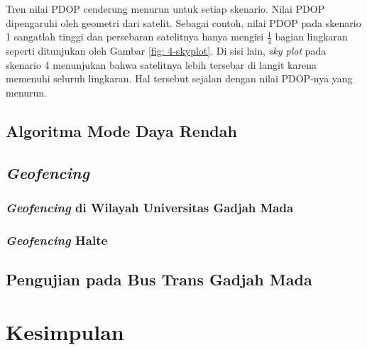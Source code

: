 \documentclass[conference]{IEEEtran}
\begin{document}
Tren nilai PDOP cenderung menurun untuk setiap skenario. Nilai PDOP dipengaruhi oleh geometri dari satelit. Sebagai contoh, nilai PDOP pada skenario 1 sangatlah tinggi dan persebaran satelitnya hanya mengisi $\frac{1}{4}$ bagian lingkaran seperti ditunjukan oleh Gambar \ref{fig: 4-skyplot}. Di sisi lain, \textit{sky plot} pada skenario 4 menunjukan bahwa satelitnya lebih tersebar di langit karena memenuhi seluruh lingkaran. Hal tersebut sejalan dengan nilai PDOP-nya yang menurun.

\subsection{Algoritma Mode Daya Rendah}

\subsection{\textit{Geofencing}}
\subsubsection{\textit{Geofencing} di Wilayah Universitas Gadjah Mada}
\subsubsection{\textit{Geofencing} Halte}

\subsection{Pengujian pada Bus Trans Gadjah Mada}

\section{Kesimpulan}

{}

\end{document}

